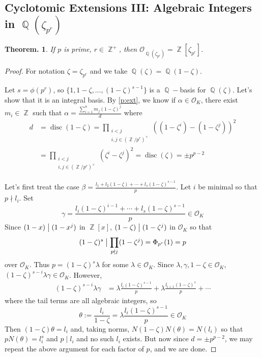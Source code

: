 \documentclass[11pt, a4paper]{memoir}
\DeclareMathOperator{\Q}{{\mathbb{Q}}}
\DeclareMathOperator{\Z}{{\mathbb{Z}}}
\renewcommand{\div}{\bigm|}
\theoremstyle{change}
\newtheorem{theorem}{Theorem.}[section]
\theoremstyle{plain}
\theoremstyle{nonumberplain}
\newtheorem{proof}{Proof}
\DeclareMathOperator{\disc}{disc}
\numberwithin{equation}{section}
\begin{document}
\subsection{Cyclotomic Extensions III: Algebraic Integers in \texorpdfstring{$\Q(\zeta_{p^r})$}{Qzpr}}
\begin{theorem}\label{t:cepr}
    If $p$ is prime, $r\in\Z^+$, then $\mathcal{O}_{\Q(\zeta_{p^r})}=\Z[\zeta_{p^r}]$.
\end{theorem}
\begin{proof}
    For notation $\zeta=\zeta_{p^r}$ and we take $\Q(\zeta)=\Q(1-\zeta)$.

    Let $s=\phi(p^r)$, so $\{1,1-\zeta,\ldots,(1-\zeta)^{s-1}\}$ is a $\Q-$basis for $\Q(\zeta)$.
    Let's show that it is an integral basis.
    By \cref{p:ext}, we know if $\alpha\in\mathcal{O}_K$, there exist $m_i\in\Z$ such that $\alpha=\frac{\sum_{i=1}^n m_j(1-\zeta)^j}{d}$ where
    \begin{align*}
        d &= \disc(1-\zeta)= \prod_{\substack{i<j\\i,j\in(\Z/p^r)^\times}}((1-\zeta^i)-(1-\zeta^j))^2\\
          &= \prod_{\substack{i<j\\i,j\in(\Z/p^r)^\times}}(\zeta^i-\zeta^j)^2= \disc(\zeta)=\pm p^{p-2}
    \end{align*}

    Let's first treat the case $\beta=\frac{l_1+l_2(1-\zeta)+\cdots+l_s(1-\zeta)^{s-1}}{p}$.
    Let $i$ be minimal so that $p\nmid l_i$.
    Set
    \begin{equation*}
        \gamma=\frac{l_i(1-\zeta)^{i-1}+\cdots+l_s(1-\zeta)^{s-1}}{p}\in\mathcal{O}_K
    \end{equation*}
    Since $(1-x)\div(1-x^j)$ in $\Z[x]$, $(1-\zeta)\div(1-\zeta^j)$ in $\mathcal{O}_K$ so that
    \begin{equation*}
        (1-\zeta)^s\div \prod_{p\nmid j}(1-\zeta^j)=\Phi_{p^r}(1)=p
    \end{equation*}
    over $\mathcal{O}_K$.
    Thus $p=(1-\zeta)^s\lambda$ for some $\lambda\in\mathcal{O}_K$.
    Since $\lambda,\gamma,1-\zeta\in\mathcal{O}_K$, $(1-\zeta)^{s-i}\lambda\gamma\in\mathcal{O}_K$.
    However,
    \begin{align*}
        (1-\zeta)^{s-i}\lambda\gamma &= \lambda\frac{l_i(1-\zeta)^{s-1}}{p}+\lambda\frac{l_{i+1}(1-\zeta)^s}{p}+\cdots
    \end{align*}
    where the tail terms are all algebraic integers, so
    \begin{equation*}
        \theta:=\frac{l_i}{1-\zeta}=\lambda\frac{l_i(1-\zeta)^{s-1}}{p}\in\mathcal{O}_K
    \end{equation*}
    Then $(1-\zeta)\theta=l_i$ and, taking norms, $N(1-\zeta)N(\theta)=N(l_i)$ so that $pN(\theta)=l_i^s$ and $p\mid l_i$ and no such $l_i$ exists.
    But now since $d=\pm p^{p-2}$, we may repeat the above argument for each factor of $p$, and we are done.
\end{proof}
\end{document}
